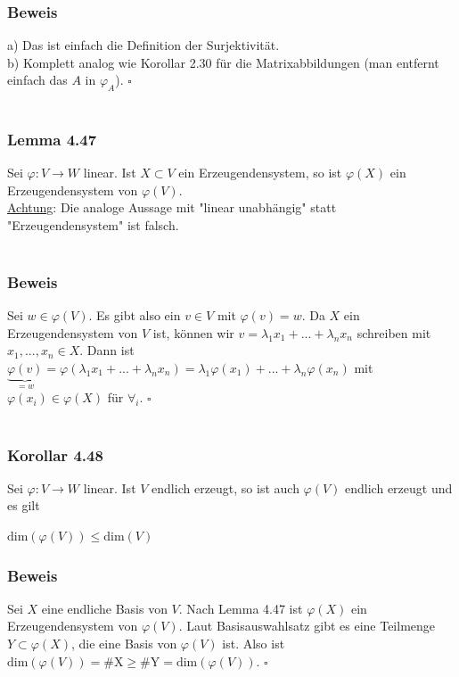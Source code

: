 \documentclass{article}
\begin{document}
\subsubsection*{Beweis}
a) Das ist einfach die Definition der Surjektivität. \\
b) Komplett analog wie Korollar 2.30 für die Matrixabbildungen (man entfernt einfach das $A$ in $\varphi_A$). $\square$ \\
\\
\subsubsection*{Lemma 4.47}
Sei $\varphi: V \rightarrow W$ linear. Ist $X \subset V$ ein Erzeugendensystem, so ist $\varphi(X)$ ein Erzeugendensystem von $\varphi(V)$. \\
\underline{Achtung}: Die analoge Aussage mit "linear unabhängig" statt "Erzeugendensystem" ist falsch. \\
\\
\subsubsection*{Beweis}
Sei $w \in \varphi(V)$. Es gibt also ein $v \in V$ mit $\varphi(v) = w$. Da $X$ ein Erzeugendensystem von $V$ ist, können wir $v = \lambda_1 x_1 + ... + \lambda_n x_n$ schreiben mit $x_1,...,x_n \in X$. Dann ist $\underbrace{\varphi(v)}_{=w} = \varphi(\lambda_1 x_1 + ... + \lambda_n x_n) = \lambda_1 \varphi(x_1) + ... + \lambda_n \varphi(x_n)$ mit $\varphi(x_i) \in \varphi(X)$ für $\forall_i$. $\square$ \\
\\
\subsubsection*{Korollar 4.48}
Sei $\varphi: V \rightarrow W$ linear. Ist $V$ endlich erzeugt, so ist auch $\varphi(V)$ endlich erzeugt und es gilt \\
\begin{center}
    $\text{dim}(\varphi(V)) \leq \text{dim}(V)$ \\
\end{center}
\subsubsection*{Beweis}
Sei $X$ eine endliche Basis von $V$. Nach Lemma 4.47 ist $\varphi(X)$ ein Erzeugendensystem von $\varphi(V)$. 
Laut Basisauswahlsatz gibt es eine Teilmenge $Y \subset \varphi(X)$, die eine Basis von $\varphi(V)$ ist.
Also ist $\text{dim}(\varphi(V)) = \#\text{X} \geq \#\text{Y} = \text{dim}(\varphi(V))$. $\square$ \\
\\
\end{document}
